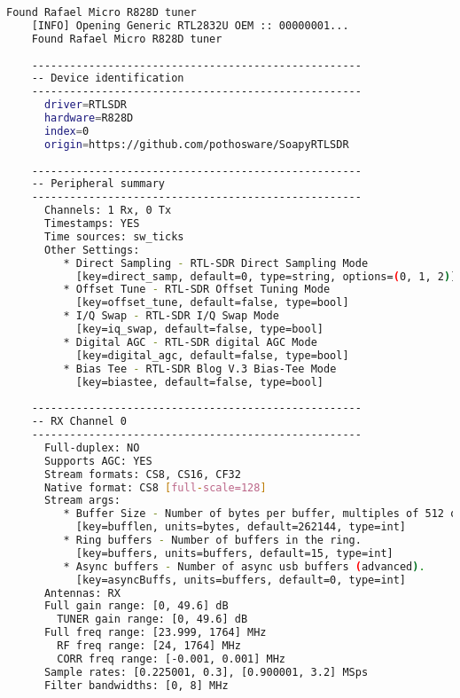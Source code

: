 \begin{appendices}
\begin{lstlisting}[language=bash, caption={SoapySDRUtil Probe Output for RTL-SDR}, label={lst: soapyProbeRTL}]
    Found Rafael Micro R828D tuner
    [INFO] Opening Generic RTL2832U OEM :: 00000001...
    Found Rafael Micro R828D tuner
    
    ----------------------------------------------------
    -- Device identification
    ----------------------------------------------------
      driver=RTLSDR
      hardware=R828D
      index=0
      origin=https://github.com/pothosware/SoapyRTLSDR
    
    ----------------------------------------------------
    -- Peripheral summary
    ----------------------------------------------------
      Channels: 1 Rx, 0 Tx
      Timestamps: YES
      Time sources: sw_ticks
      Other Settings:
         * Direct Sampling - RTL-SDR Direct Sampling Mode
           [key=direct_samp, default=0, type=string, options=(0, 1, 2)]
         * Offset Tune - RTL-SDR Offset Tuning Mode
           [key=offset_tune, default=false, type=bool]
         * I/Q Swap - RTL-SDR I/Q Swap Mode
           [key=iq_swap, default=false, type=bool]
         * Digital AGC - RTL-SDR digital AGC Mode
           [key=digital_agc, default=false, type=bool]
         * Bias Tee - RTL-SDR Blog V.3 Bias-Tee Mode
           [key=biastee, default=false, type=bool]
    
    ----------------------------------------------------
    -- RX Channel 0
    ----------------------------------------------------
      Full-duplex: NO
      Supports AGC: YES
      Stream formats: CS8, CS16, CF32
      Native format: CS8 [full-scale=128]
      Stream args:
         * Buffer Size - Number of bytes per buffer, multiples of 512 only.
           [key=bufflen, units=bytes, default=262144, type=int]
         * Ring buffers - Number of buffers in the ring.
           [key=buffers, units=buffers, default=15, type=int]
         * Async buffers - Number of async usb buffers (advanced).
           [key=asyncBuffs, units=buffers, default=0, type=int]
      Antennas: RX
      Full gain range: [0, 49.6] dB
        TUNER gain range: [0, 49.6] dB
      Full freq range: [23.999, 1764] MHz
        RF freq range: [24, 1764] MHz
        CORR freq range: [-0.001, 0.001] MHz
      Sample rates: [0.225001, 0.3], [0.900001, 3.2] MSps
      Filter bandwidths: [0, 8] MHz
    

\end{lstlisting}


\end{appendices}
